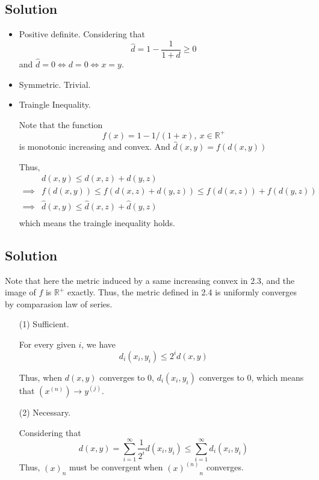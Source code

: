 \documentclass{article}
\begin{document}
\subsection{Solution}
\begin{itemize}
    \item Positive definite.
    Considering that
    \[\hat d = 1 - \frac{1}{1 + d} \ge 0\]
    and \(\hat d = 0 \iff d = 0 \iff x = y\).

    \item Symmetric. Trivial.
    \item Traingle Inequality.
    
    Note that the function
    \[f(x) = 1 - 1/(1 + x),\ x \in \mathbb{R^+} \]
    is monotonic increasing and convex. And \(\hat d(x, y)= f(d(x, y))\)

    Thus,
    \begin{align*}
        &d(x, y) 
        \le d(x, z) + d(y, z)\\
    \implies& f(d(x, y)) \le f(d(x, z) + d(y, z)) \le f(d(x, z)) + f(d(y, z))\\
    \implies& \hat d(x, y) \le \hat d(x, z) + \hat d(y, z)\\
    \end{align*}
    which means the traingle inequality holds.
\end{itemize}


\subsection{Solution}
Note that here the metric induced by a same increasing convex in 2.3, and the image of \(f\) is \(\mathbb{R^+}\) exactly. Thus, the metric defined in 2.4 is uniformly converges by comparasion law of series.
\begin{enumerate}
    \item[(1)] Sufficient.
    
    For every given \(i\), we have
    \[d_i(x_i, y_i) \le 2^i d(x, y)\]

    Thus, when \(d(x, y)\) converges to 0, \(d_i(x_i, y_i)\) converges to 0, which means that \({(x^{(n)})} \to y^{(j)}\).
    \item[(2)] Necessary.
    
    Considering that
    \[d(x, y) = \sum_{i = 1}^{\infty}\frac{1}{2^i} d(x_i, y_i) \le \sum_{i = 1}^{\infty} d_i(x_i, y_i)\]
    Thus, \({(x)}_n\) must be convergent when \({{(x)}^{(n)}}_n\) converges.
\end{enumerate}
\end{document}
